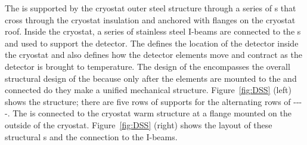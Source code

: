 The  is supported by the
cryostat outer steel structure through a series of \fdth{}s that cross through the cryostat insulation and anchored with flanges on
the cryostat roof. 
Inside the cryostat, a series of stainless steel I-beams are connected to the \fdth{}s and used to support the
detector. 
The  defines the location of the detector inside the cryostat and also defines how the detector elements move and contract as the detector is brought to  temperature. 
The design of the  encompasses the overall
structural design of the  because only after the elements are mounted to the  and connected do they make a unified mechanical structure. 
Figure~\ref{fig:DSS} (left) shows the  structure; there are
five rows of supports for the alternating rows of
----.  
The  is connected to the cryostat warm structure at a flange mounted on the outside of the cryostat.  
Figure~\ref{fig:DSS} (right)
shows the layout of these structural \fdth{}s and the connection to the I-beams.

